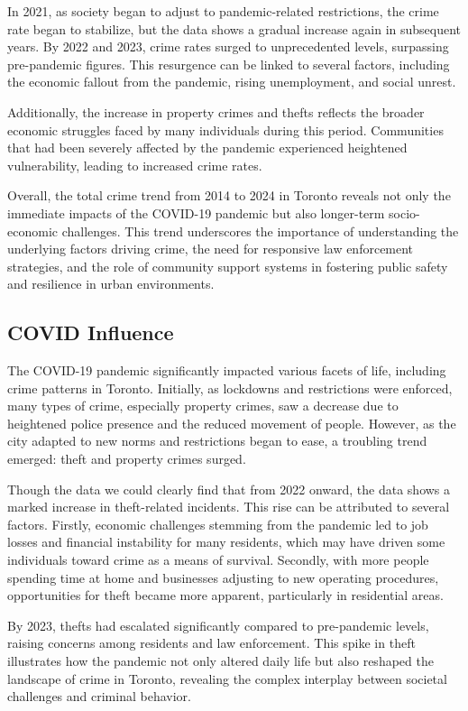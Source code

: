 \documentclass[
  letterpaper,
  DIV=11,
  numbers=noendperiod]{scrartcl}
\begin{document}
In 2021, as society began to adjust to pandemic-related restrictions,
the crime rate began to stabilize, but the data shows a gradual increase
again in subsequent years. By 2022 and 2023, crime rates surged to
unprecedented levels, surpassing pre-pandemic figures. This resurgence
can be linked to several factors, including the economic fallout from
the pandemic, rising unemployment, and social unrest.

Additionally, the increase in property crimes and thefts reflects the
broader economic struggles faced by many individuals during this period.
Communities that had been severely affected by the pandemic experienced
heightened vulnerability, leading to increased crime rates.

Overall, the total crime trend from 2014 to 2024 in Toronto reveals not
only the immediate impacts of the COVID-19 pandemic but also longer-term
socio-economic challenges. This trend underscores the importance of
understanding the underlying factors driving crime, the need for
responsive law enforcement strategies, and the role of community support
systems in fostering public safety and resilience in urban environments.

\hypertarget{covid-influence}{%
\subsection{COVID Influence}\label{covid-influence}}

The COVID-19 pandemic significantly impacted various facets of life,
including crime patterns in Toronto. Initially, as lockdowns and
restrictions were enforced, many types of crime, especially property
crimes, saw a decrease due to heightened police presence and the reduced
movement of people. However, as the city adapted to new norms and
restrictions began to ease, a troubling trend emerged: theft and
property crimes surged.

Though the data we could clearly find that from 2022 onward, the data
shows a marked increase in theft-related incidents. This rise can be
attributed to several factors. Firstly, economic challenges stemming
from the pandemic led to job losses and financial instability for many
residents, which may have driven some individuals toward crime as a
means of survival. Secondly, with more people spending time at home and
businesses adjusting to new operating procedures, opportunities for
theft became more apparent, particularly in residential areas.

By 2023, thefts had escalated significantly compared to pre-pandemic
levels, raising concerns among residents and law enforcement. This spike
in theft illustrates how the pandemic not only altered daily life but
also reshaped the landscape of crime in Toronto, revealing the complex
interplay between societal challenges and criminal behavior.
\end{document}
